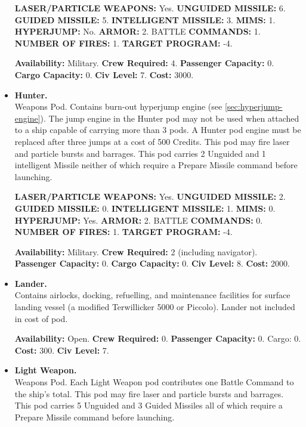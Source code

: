 \begin{itemize}
  \textbf{LASER/PARTICLE WEAPONS:} Yes. \textbf{UNGUIDED MISSILE:} 6.
  \textbf{GUIDED MISSILE:} 5.  \textbf{INTELLIGENT MISSILE:} 3.
  \textbf{MIMS:} 1.  \textbf{HYPERJUMP:} No. \textbf{ARMOR:} 2. BATTLE
  \textbf{COMMANDS:} 1. \textbf{NUMBER OF FIRES:} 1.  \textbf{TARGET
    PROGRAM:} -4.

  
  \textbf{Availability:} Military. \textbf{Crew Required:} 4.
  \textbf{Passenger Capacity:} 0.  \textbf{Cargo Capacity:} 0.
  \textbf{Civ Level:} 7. \textbf{Cost:} 3000.
  
  
  

\item\textbf{Hunter.}\\
  Weapons Pod. Contains burn-out hyperjump engine (see
  \ref{sec:hyperjump-engine}).  The jump engine in the Hunter pod may
  not be used when attached to a ship capable of carrying more than 3
  pods.  A Hunter pod engine must be replaced after three jumps at a
  cost of 500 Credits. This pod may fire laser and particle bursts and
  barrages. This pod carries 2 Unguided and 1 intelligent Missile
  neither of which require a Prepare Missile command before launching.
  
  \textbf{LASER/PARTICLE WEAPONS:} Yes. \textbf{UNGUIDED MISSILE:} 2.
  \textbf{GUIDED MISSILE:} 0.  \textbf{INTELLIGENT MISSILE:} 1.
  \textbf{MIMS:} 0.  \textbf{HYPERJUMP:} Yes. \textbf{ARMOR:} 2.
  BATTLE \textbf{COMMANDS:} 0. \textbf{NUMBER OF FIRES:} 1.
  \textbf{TARGET PROGRAM:} -4.

  
  \textbf{Availability:} Military. \textbf{Crew Required:} 2
  (including navigator).  \textbf{Passenger Capacity:} 0.
  \textbf{Cargo Capacity:} 0. \textbf{Civ Level:} 8. \textbf{Cost:}
  2000.
  
  

\item\textbf{Lander.}\\
  Contains airlocks, docking, refuelling, and maintenance facilities
  for surface landing vessel (a modified Terwillicker 5000 or
  Piccolo).  Lander not included in cost of pod.

  
  \textbf{Availability:} Open. \textbf{Crew Required:} 0.
  \textbf{Passenger Capacity:} 0. Cargo: 0.  \textbf{Cost:} 300.
  \textbf{Civ Level:} 7.
  
  

\item\textbf{\hypertarget{tag:pod-light-weapon}{Light Weapon}.}\\
  Weapons Pod. Each Light Weapon pod contributes one Battle Command to
  the ship's total. This pod may fire laser and particle bursts and
  barrages. This pod carries 5 Unguided and 3 Guided Missiles all of
  which require a Prepare Missile command before launching.
  

\end{itemize}
